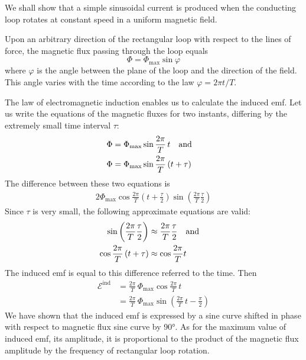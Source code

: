 We shall show that a simple sinusoidal current is produced when the conducting loop rotates at constant speed in a uniform magnetic field.

Upon an arbitrary direction of the rectangular loop with respect to the lines of force, the magnetic flux passing through the loop equals
\begin{equation*}%
\Phi = \Phi_{\textrm{max}} \sin \varphi
\end{equation*}
where $\varphi$ is the angle between the plane of the loop and the direction of the field. This angle varies with the time according to the law $\varphi =2 \pi t/T$.

The law of electromagnetic induction enables us to calculate the induced emf. Let us write the equations of the magnetic fluxes for two instants, differing by the extremely small time interval $\tau$:
\begin{align*}%
\Phi & = \Phi_{\textrm{max}} \sin \frac{2\pi}{T} \, t \qq{and} \\
\Phi & = \Phi_{\textrm{max}} \sin \frac{2\pi}{T} \, (t + \tau) 
\end{align*}
The difference between these two equations is
\begin{align*}%
2 \Phi_{\textrm{max}} \cos \frac{2 \pi}{T}\left( t + \frac{\tau}{2} \right) \sin \left( \frac{2 \pi}{T} \frac{\tau}{2} \right) 
\end{align*}
Since $\tau$ is very small, the following approximate equations are valid:
\begin{align*}%
\sin \left( \frac{2 \pi}{T} \frac{\tau}{2} \right)  & \approx \frac{2 \pi}{T} \frac{\tau}{2} \qq{and} \\
\cos \frac{2 \pi}{T}  \, (t + \tau)  & \approx \cos \frac{2 \pi}{T} t
\end{align*}
The induced emf is equal to this difference referred to the time. Then
\begin{align*}%
\mathcal{E}^{\textrm{ind}} & = \frac{2 \pi}{T}\, \Phi_{\textrm{max}} \cos \frac{2 \pi}{T} \, t \\
& = \frac{2 \pi}{T}\, \Phi_{\textrm{max}} \sin \left(\frac{2 \pi}{T} \, t - \frac{\pi}{2} \right)
\end{align*}
We have shown that the induced emf is expressed by a sine curve shifted in phase with respect to magnetic flux sine curve by \ang{90}. As for the maximum value of induced emf, its amplitude, it is proportional to the product of the magnetic flux amplitude by the frequency of rectangular loop rotation.

